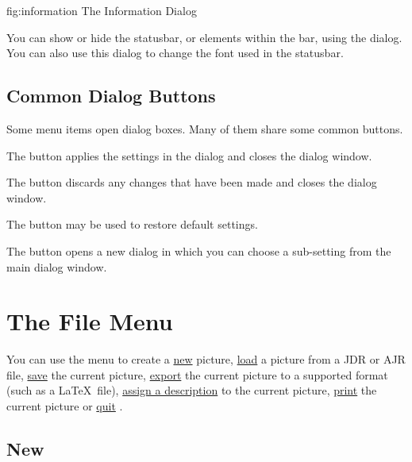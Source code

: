 \FloatFig
  {fig:information}
  {}
  {The Information Dialog}

You can show or hide the \gls*{statusbar}, or elements within the
bar, using the  dialog. You can also use this
dialog to change the font used in the \gls*{statusbar}.

\section{Common Dialog Buttons}\label{sec:commonwidgets}

Some menu items open dialog boxes. Many of them share some common
buttons.


The  button applies the settings in the dialog and
closes the dialog window.


The  button discards any changes that have been made
and closes the dialog window.


The  button may be used to restore default
settings.


The  button opens a new dialog in which you
can choose a sub-setting from the main dialog window.

\chapter{The File Menu}\label{sec:filemenu}


You can use the  menu to create a
\hyperref[sec:newimage]{new} picture,
\hyperref[sec:loadimage]{load} a picture from a
\gls{JDR} or \gls{AJR} file,
\hyperref[sec:saveimage]{save} the current picture,
\hyperref[sec:exportimage]{export} the current
picture to a supported format (such as a \LaTeX\ file),
\hyperref[sec:imagedescription]{assign a description} to the
current picture, \hyperref[sec:print]{print} the
current picture or \hyperref[sec:quit]{quit} \FlowframTk.

\section{New}\label{sec:newimage}

